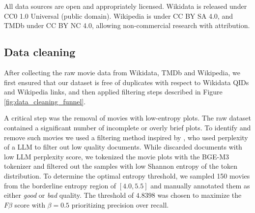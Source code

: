 \documentclass{article}
\begin{document}
All data sources are open and appropriately licensed. Wikidata \cite{wikidata} is released under CC0 1.0 Universal (public domain). Wikipedia \cite{wikipedia} is under CC BY SA 4.0, and TMDb \cite{tmdb} under CC BY NC 4.0, allowing non-commercial research with attribution.


\subsection{Data cleaning}

After collecting the raw movie data from Wikidata, TMDb and Wikipedia, we first ensured that our dataset is free of duplicates with respect to Wikidata QIDs and Wikipedia links, and then applied filtering steps described in Figure \ref{fig:data_cleaning_funnel}.



A critical step was the removal of movies with low-entropy plots. The raw dataset contained a significant number of incomplete or overly brief plots. To identify and remove such movies we used a filtering method inspired by \cite{wenzek2019ccnetextractinghighquality}, who used perplexity of a LLM to filter out low quality documents. While \cite{wenzek2019ccnetextractinghighquality} discarded documents with low LLM perplexity score, we tokenized the movie plots with the BGE-M3 tokenizer and filtered out the samples with low Shannon entropy of the token distribution. To determine the optimal entropy threshold, we sampled 150 movies from the borderline entropy region of $[4.0, 5.5]$ and manually annotated them as either \textit{good} or \textit{bad} quality. The threshold of $4.8398$ was chosen to maximize the $F\beta$ score with $\beta=0.5$ prioritizing precision over recall.
\end{document}
